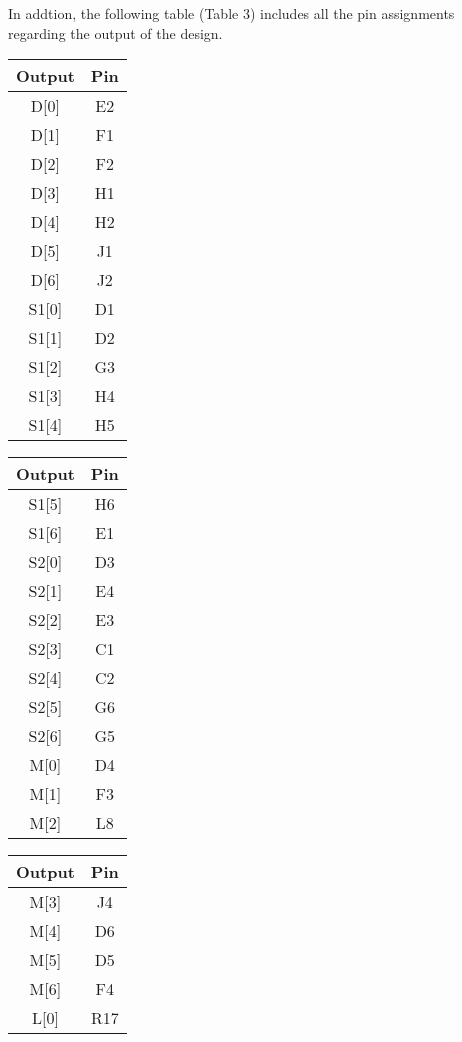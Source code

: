 \documentclass[12pt,a4paper]{article}
\begin{document}
\noindent In addtion, the following table (Table 3) includes all the pin assignments regarding the output of the design.


	\begin{table}[H]
	\centering
	\begin{tabular}{|c | c| }
		\hline
		\textbf{Output} & \textbf{Pin} \\ \hline
		D[0]& E2\\\hline
		D[1]& F1\\\hline
		D[2]& F2\\\hline
		D[3]&H1\\\hline
		D[4]& H2\\\hline
		D[5]&J1\\\hline
		D[6]&J2\\\hline
		S1[0]&D1\\\hline
		S1[1]&D2\\\hline
		S1[2]&G3\\\hline
		S1[3]&H4\\\hline
		S1[4]&H5\\\hline
	\end{tabular}
	\hspace{0.2cm}
	\begin{tabular}{|c | c| }
		\hline
		\textbf{Output} & \textbf{Pin} \\ \hline
		S1[5]&H6\\\hline
		S1[6]&E1\\\hline
		S2[0]&D3\\\hline
		S2[1]&E4\\\hline
		S2[2]&E3\\\hline
		S2[3]&C1\\\hline
		S2[4]&C2\\\hline
		S2[5]&G6\\\hline
		S2[6]&G5\\\hline
		M[0]&D4\\\hline
		M[1]&F3\\\hline
		M[2]&L8\\\hline
	\end{tabular}
	\hspace{0.2cm}
	\begin{tabular}{|c | c| }
		\hline
		\textbf{Output} & \textbf{Pin}  \\ \hline
		M[3]&J4\\\hline
		M[4]&D6\\\hline
		M[5]&D5\\\hline
		M[6]&F4\\\hline
		L[0]&R17\\\hline

\end{tabular}
\end{table}
\end{document}
